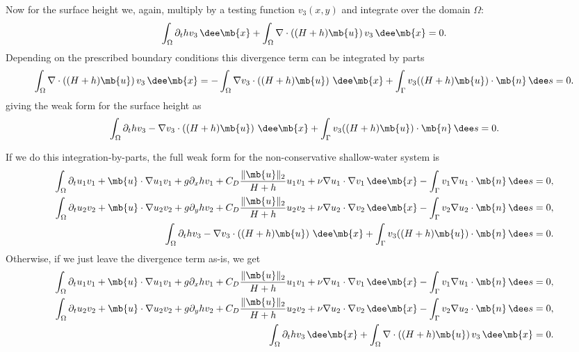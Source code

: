 \documentclass[11pt]{article}
\begin{document}
Now for the surface height we, again, multiply by a testing function $v_3(x, y)$
and integrate over the domain $\Omega$:
\[
  \int_\Omega \partial_t h v_3 \, \dee \mb{x}
  + \int_\Omega \nabla \cdot \left( (H + h) \mb{u} \right) v_3 \, \dee \mb{x} = 0.
\]
Depending on the prescribed boundary conditions this divergence term can be
integrated by parts
\[
  \int_\Omega \nabla \cdot \left( (H + h) \mb{u} \right) v_3 \, \dee \mb{x}
  = - \int_\Omega \nabla v_3 \cdot \left( (H + h) \mb{u} \right) \, \dee \mb{x}
  + \int_\Gamma v_3 ((H + h) \mb{u}) \cdot \mb{n} \, \dee s = 0.
\]
giving the weak form for the surface height as
\[
  \int_\Omega \partial_t h v_3
   - \nabla v_3 \cdot \left( (H + h) \mb{u} \right) \, \dee \mb{x}
  + \int_\Gamma v_3 ((H + h) \mb{u}) \cdot \mb{n} \, \dee s = 0.
\]

If we do this integration-by-parts, the full weak form for the non-conservative
shallow-water system is
\begin{align*}
  \int_\Omega
  \partial_t u_1 v_1 +  \mb{u} \cdot \nabla u_1 v_1 +  g \partial_x h v_1
  + C_D \frac{\lVert \mb{u} \rVert_2}{H + h} u_1 v_1
  + \nu \nabla u_1 \cdot \nabla v_1 \, \dee \mb{x}
  - \int_\Gamma v_1 \nabla u_1 \cdot \mb{n} \, \dee s &= 0, \\
  \int_\Omega \partial_t u_2 v_2 +  \mb{u} \cdot \nabla u_2 v_2 +  g \partial_y h v_2
  + C_D \frac{\lVert \mb{u} \rVert_2}{H + h} u_2 v_2
  + \nu \nabla u_2 \cdot \nabla v_2 \, \dee \mb{x}
  - \int_\Gamma v_2 \nabla u_2 \cdot \mb{n} \, \dee s &= 0, \\
  \int_\Omega \partial_t h v_3
  - \nabla v_3 \cdot \left( (H + h) \mb{u} \right) \, \dee \mb{x}
  + \int_\Gamma v_3 ((H + h) \mb{u}) \cdot \mb{n} \, \dee s &= 0.
\end{align*}
Otherwise, if we just leave the divergence term as-is, we get
\begin{align*}
  \int_\Omega
  \partial_t u_1 v_1 +  \mb{u} \cdot \nabla u_1 v_1 +  g \partial_x h v_1
  + C_D \frac{\lVert \mb{u} \rVert_2}{H + h} u_1 v_1
  + \nu \nabla u_1 \cdot \nabla v_1 \, \dee \mb{x}
  - \int_\Gamma v_1 \nabla u_1 \cdot \mb{n} \, \dee s &= 0, \\
  \int_\Omega \partial_t u_2 v_2 +  \mb{u} \cdot \nabla u_2 v_2 +  g \partial_y h v_2
  + C_D \frac{\lVert \mb{u} \rVert_2}{H + h} u_2 v_2
  + \nu \nabla u_2 \cdot \nabla v_2 \, \dee \mb{x}
  - \int_\Gamma v_2 \nabla u_2 \cdot \mb{n} \, \dee s &= 0, \\
  \int_\Omega \partial_t h v_3 \, \dee \mb{x}
  + \int_\Omega \nabla \cdot \left( (H + h) \mb{u} \right) v_3 \, \dee \mb{x} &= 0.
\end{align*}
\end{document}

